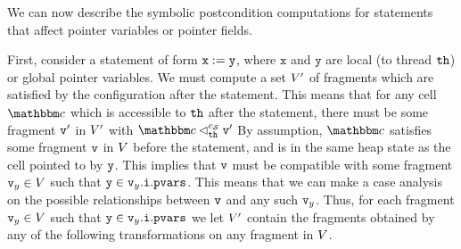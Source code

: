 We can now describe the symbolic postcondition computations for
statements that affect pointer variables or pointer fields.

First, consider a statement of form
${\tt x := y}$, where $\mathtt{x}$ and $\mathtt{y}$ are local
(to thread ${\tt th}$) or global pointer variables.
We must compute a set $V'$ of
fragments which are satisfied by the configuration after the statement. This
means that for any cell $\cell$ which is accessible to ${\tt th}$ after
the statement, there must be some fragment $\mathtt{v}'$ in $V'$
with $\cell \satfrag{\thread}{\sconf} \frag'$
By assumption, $\cell$ satisfies some fragment $\mathtt{v}$ in $V$
before the statement, and is in the same heap state as the cell pointed to by
$\mathtt{y}$.
This implies that $\mathtt{v}$ must be compatible with some
fragment $\mathtt{v}_y\in V$ such that $\mathtt{y} \in \mathtt{v}_y.\mathtt{i}.\mathtt{pvars}$. This means that we can make a case analysis on the possible relationships
between $\mathtt{v}$ and any such $\mathtt{v}_y$.
Thus, for each fragment $\mathtt{v}_y\in V$ such that
$\mathtt{y} \in \mathtt{v}_y.\mathtt{i}.\mathtt{pvars}$ we let $V'$ contain
the fragments obtained by any of the following transformations on any fragment in
$V$.
